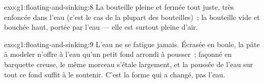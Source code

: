 \begin{solution}{exo:g1:floating-and-sinking:8}
La bouteille pleine et fermée  tout juste, très enfoncée dans
l'eau (c'est le cas de la plupart des bouteilles)~; la bouteille vide
et bouchée  haut, portée par l'eau --- elle est surtout pleine
d'air.
\end{solution}

\begin{solution}{exo:g1:floating-and-sinking:9}
L'eau ne se fatigue jamais. Écrasée en boule, la pâte à modeler
n'offre à l'eau qu'un petit fond arrondi à pousser~; façonné en
barquette creuse, le même morceau s'étale largement, et la poussée de
l'eau sur tout ce fond suffit à le soutenir. C'est la forme qui a
changé, pas l'eau.
\end{solution}
